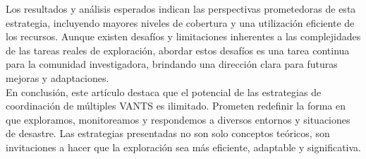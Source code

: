 \documentclass[sigconf]{acmart}
\begin{document}



Los resultados y análisis esperados indican las perspectivas prometedoras de esta estrategia, incluyendo mayores niveles de cobertura y una utilización eficiente de los recursos. Aunque existen desafíos y limitaciones inherentes a las complejidades de las tareas reales de exploración, abordar estos desafíos es una tarea continua para la comunidad investigadora, brindando una dirección clara para futuras mejoras y adaptaciones.\\


En conclusión, este artículo destaca que el potencial de las estrategias de coordinación de múltiples VANTS es ilimitado. Prometen redefinir la forma en que exploramos, monitoreamos y respondemos a diversos entornos y situaciones de desastre. Las estrategias presentadas no son solo conceptos teóricos, son invitaciones a hacer que la exploración sea más eficiente, adaptable y significativa.\\
\end{document}
